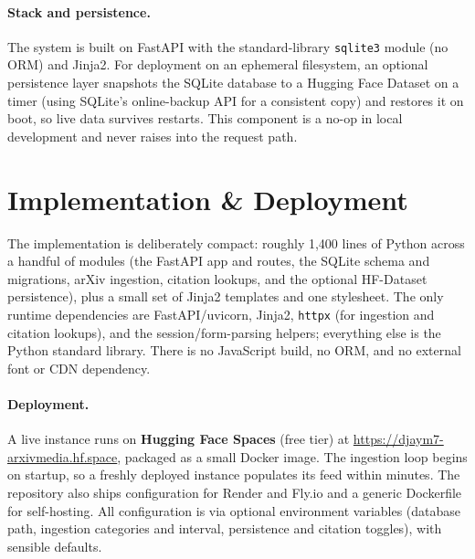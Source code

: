 \documentclass[10pt,twocolumn]{article}
\begin{document}
\paragraph{Stack and persistence.}
The system is built on FastAPI with the standard-library \texttt{sqlite3} module
(no ORM) and Jinja2. For deployment on an ephemeral filesystem, an optional
persistence layer snapshots the SQLite database to a Hugging Face Dataset on a
timer (using SQLite's online-backup API for a consistent copy) and restores it on
boot, so live data survives restarts. This component is a no-op in local
development and never raises into the request path.


\section{Implementation \& Deployment}
\label{sec:impl}

The implementation is deliberately compact: roughly 1{,}400 lines of Python
across a handful of modules (the FastAPI app and routes, the SQLite schema and
migrations, arXiv ingestion, citation lookups, and the optional HF-Dataset
persistence), plus a small set of Jinja2 templates and one stylesheet. The only
runtime dependencies are FastAPI/uvicorn, Jinja2, \texttt{httpx} (for ingestion
and citation lookups), and the session/form-parsing helpers; everything else is
the Python standard library. There is no JavaScript build, no ORM, and no
external font or CDN dependency.

\paragraph{Deployment.}
A live instance runs on \textbf{Hugging Face Spaces} (free tier) at
\url{https://djaym7-arxivmedia.hf.space}, packaged as a small Docker image. The
ingestion loop begins on startup, so a freshly deployed instance populates its
feed within minutes. The repository also ships configuration for Render and
Fly.io and a generic Dockerfile for self-hosting. All configuration is via
optional environment variables (database path, ingestion categories and interval,
persistence and citation toggles), with sensible defaults.
\end{document}
